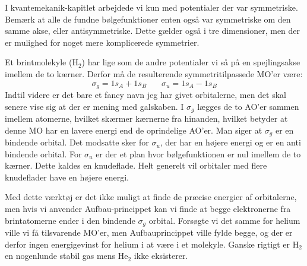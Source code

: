 \documentclass[../main.tex]{subfiles}
\begin{document}
I kvantemekanik-kapitlet arbejdede vi kun med potentialer der var symmetriske. Bemærk at alle de fundne bølgefunktioner enten også var symmetriske om den samme akse, eller antisymmetriske. Dette gælder også i tre dimensioner, men der er mulighed for noget mere komplicerede symmetrier. 

Et brintmolekyle (H$_2$) har lige som de andre potentialer vi så på en spejlingsakse imellem de to kærner. Derfor må de resulterende symmetritilpassede MO'er være:
\begin{equation*}
    \sigma_g = 1s_A+1s_B~~~~~~~~\sigma_u = 1s_A-1s_B
\end{equation*}
Indtil videre er det bare et fancy navn jeg har givet orbitalerne, men det skal senere vise sig at der er mening med galskaben.
I $\sigma_g$ lægges de to AO'er sammen imellem atomerne, hvilket skærmer kærnerne fra hinanden, hvilket betyder at denne MO har en lavere energi end de oprindelige AO'er. Man siger at $\sigma_g$ er en bindende orbital.
Det modsatte sker for $\sigma_u$, der har en højere energi og er en anti bindende orbital.
For $\sigma_u$ er der et plan hvor bølgefunktionen er nul imellem de to kærner. Dette kaldes en knudeflade. Helt generelt vil orbitaler med flere knudeflader have en højere energi.

Med dette værktøj er det ikke muligt at finde de præcise energier af orbitalerne, men hvis vi anvender Aufbau-princippet kan vi finde at begge elektronerne fra brintatomerne ender i den bindende $\sigma_g$ orbital. Forsøgte vi det samme for helium ville vi få tilsvarende MO'er, men Aufbauprincippet ville fylde begge, og der er derfor ingen energigevinst for helium i at være i et molekyle. Ganske rigtigt er H$_2$ en nogenlunde stabil gas mens He$_2$ ikke eksisterer.
\end{document}
